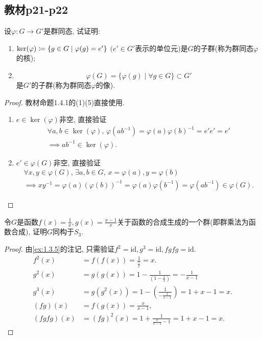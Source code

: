 \subsection{教材p21-p22}

\begin{problem}\label{ex:1.4.1}
    设$\varphi:G \to G'$是群同态, 试证明:
    \begin{enumerate}[(1)]
        \item $\ker(\varphi) \mathrel{\coloneqq} \{g \in G \mid \varphi(g) = e'\}$ $(e' \in G'$表示的单位元)是$G$的子群(称为群同态$\varphi$的核);
        \item
        \[
            \varphi(G) = \{\varphi(g) \mid \forall g \in G\} \subset G'
        \]
        是$G'$的子群(称为群同态$\varphi$的像).
    \end{enumerate}
\end{problem}

\begin{proof}
    教材命题1.4.1的(1)(5)直接使用.
    \begin{enumerate}[(1)]
        \item $e \in \ker(\varphi)$非空, 直接验证
        \[
        \begin{gathered}
            \forall a, b \in \ker(\varphi),\, \varphi(ab^{-1}) = \varphi(a)\varphi(b)^{-1} = e'e' = e'\\
            \implies ab^{-1} \in \ker(\varphi).
        \end{gathered}
        \]
        \item $e' \in \varphi(G)$非空, 直接验证
        \[
        \begin{gathered}
            \forall x, y \in \varphi(G),\, \exists a, b \in G,\, x = \varphi(a), y = \varphi(b)\\
            \implies xy^{-1} = \varphi(a)(\varphi(b))^{-1} = \varphi(a)\varphi(b^{-1}) = \varphi(ab^{-1}) \in \varphi(G).
        \end{gathered}
        \]
    \end{enumerate}
\end{proof}

\begin{problem}
    令$G$是函数$f(x) = \frac1x, g(x) = \frac{x-1}x$关于函数的合成生成的一个群(即群乘法为函数合成), 证明$G$同构于$S_3$.
\end{problem}

\begin{proof}
    由\ref{ex:1.3.5}的注记, 只需验证$f^2 = \mathrm{id}, g^3 = \mathrm{id}, fgfg = \mathrm{id}$.
    \[
    \begin{aligned}
        f^2(x) &= f(f(x)) = \frac{1}{\frac{1}{x}} = x.\\
        g^2(x) &= g(g(x)) = 1 - \frac{1}{(1 - \frac{1}{x})} = -\frac{1}{x - 1}\\
        g^3(x) &= g(g^2(x)) = 1 - (\frac{1}{-\frac{1}{x - 1}}) = 1 + x - 1 = x.\\
        (fg)(x) &= f(g(x)) = \frac{x}{x - 1},\\
        (fgfg)(x) &= (fg)^2(x) = 1 + \frac{1}{\frac{x}{x - 1} - 1} = 1 + x - 1 = x.
    \end{aligned}
    \]
\end{proof}

